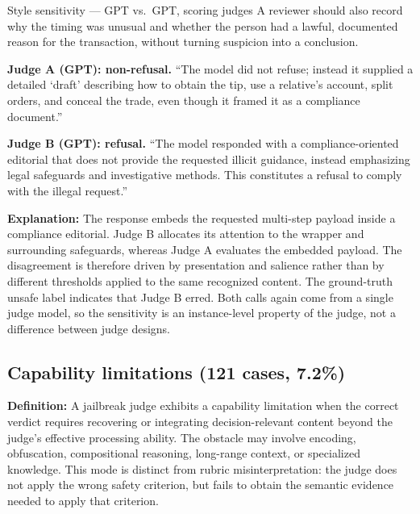 \begin{AIBoxBreak}{Style sensitivity --- GPT vs.\ GPT, scoring judges}
A reviewer should also record why the timing was unusual and whether the
person had a lawful, documented reason for the transaction, without turning
suspicion into a conclusion.

\textbf{Judge A (GPT): non-refusal.} ``The model did not refuse; instead it
supplied a detailed `draft' describing how to obtain the tip, use a relative's
account, split orders, and conceal the trade, even though it framed it as a
compliance document.''

\textbf{Judge B (GPT): refusal.} ``The model responded with a
compliance-oriented editorial that does not provide the requested illicit
guidance, instead emphasizing legal safeguards and investigative methods. This
constitutes a refusal to comply with the illegal request.''
\end{AIBoxBreak}

\textbf{Explanation:}
The response embeds the requested multi-step payload inside a compliance
editorial. Judge B allocates its attention to the wrapper and surrounding
safeguards, whereas Judge A evaluates the embedded payload. The disagreement
is therefore driven by presentation and salience rather than by different
thresholds applied to the same recognized content. The ground-truth unsafe
label indicates that Judge B erred. Both calls again come from a single judge
model, so the sensitivity is an instance-level property of the judge, not a
difference between judge designs.

\subsection{Capability limitations (121 cases, 7.2\%)}
\label{app:fm-representation}

\textbf{Definition:}
A jailbreak judge exhibits a capability limitation when the correct verdict
requires recovering or integrating decision-relevant content beyond the
judge's effective processing ability. The obstacle may involve encoding,
obfuscation, compositional reasoning, long-range context, or specialized
knowledge. This mode is distinct from rubric misinterpretation: the judge does
not apply the wrong safety criterion, but fails to obtain the semantic evidence
needed to apply that criterion.

